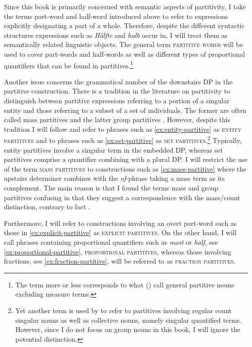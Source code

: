 Since this book is primarily concerned with semantic aspects of partitivity, I take the terms part-word and half-word introduced above to refer to expressions explicitly designating a part of a whole. Therefore, despite the different syntactic structures expressions such as \textit{Hälfte} and \textit{halb} occur in, I will treat them as semantically related linguistic objects. The general term \textsc{partitive words} will be used to cover part-words and half-words as well as different types of proportional quantifiers that can be found in partitives.\footnote{The term more or less corresponds to what \citeauthor{quirk_greenbaum_leech_svartvik1985comprehensive} (\citeyear[p. 249]{quirk_greenbaum_leech_svartvik1985comprehensive}) call general partitive nouns excluding measure terms.}

Another issue concerns the grammatical number of the downstairs DP in the partitive construction. There is a tradition in the literature on partitivity to distinguish between partitive expressions referring to a portion of a singular entity and those referring to a subset of a set of individuals. The former are often called mass partitives and the latter group partitives \citep[e.g.,][]{hoeksema1996introduction,abbott1996doing}. However, despite this tradition I will follow \citet{de_hoop1997semantic,de_hoop2003partitivity} and refer to phrases such as \ref{ex:entity-partitive} as \textsc{entity partitives} and to phrases such as \ref{ex:set-partitive} as \textsc{set partitives}.\footnote{Yet another term is used by \citet{korat2016singular} to refer to partitives involving regular count singular nouns as well as collective nouns, namely singular quantified terms. However, since I do not focus on group nouns in this book, I will ignore the potential distinction.} Typically, entity partitives involve a singular term in the embedded DP, whereas set partitives comprise a quantifier combining with a plural DP. I will restrict the use of the term \textsc{mass partitives} to constructions such as \ref{ex:mass-partitive} where the upstairs determiner combines with the \textit{of}-phrase taking a mass term as its complement. The main reason is that I found the terms mass and group partitives confusing in that they suggest a correspondence with the mass/count distinction, contrary to fact \citep[see also][]{marti_i_girbau2010syntax}.

Furthermore, I will refer to constructions involving an overt part-word such as those in \ref{ex:explicit-partitive} as \textsc{explicit partitives}. On the other hand, I will call phrases containing proportional quantifiers such as \textit{most} or \textit{half}, see \ref{ex:proportional-partitive}, \textsc{proportional partitives}, whereas those involving fractions, see \ref{ex:fraction-partitive}, will be referred to as \textsc{fraction partitives}.

